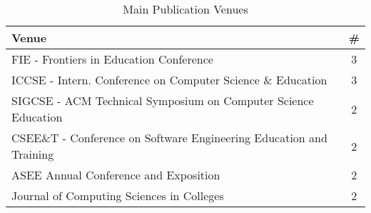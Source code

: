 \begin{table}
\caption{Main Publication Venues}
{\begin{tabular}{p{3.05in}|c}
\textbf{Venue} & \textbf{\#} \\ \hline
FIE - Frontiers in Education Conference  & 3 \\
ICCSE - Intern. Conference on Computer Science \& Education & 3 \\
SIGCSE - ACM Technical Symposium on Computer Science Education & 2 \\
CSEE\&T - Conference on Software Engineering Education and Training & 2 \\
ASEE Annual Conference and Exposition & 2 \\
Journal of Computing Sciences in Colleges & 2
\end{tabular}} 
\label{tab:publicationVenue}
\end{table}
